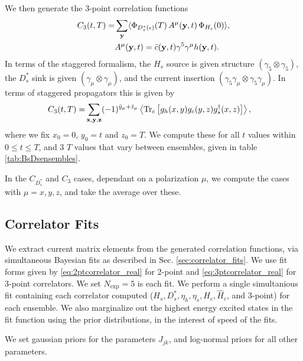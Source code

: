 We then generate the 3-point correlation functions
\begin{align}
  C_3(t,T) =& \sum_{{\bf{y}}} \langle \Phi_{D_s^*(\epsilon)}(T)\, A^{\mu}({\bf{y}},t) \,\Phi_{H_s}(0) \rangle, \\
  &A^{\mu}({\bf{y}},t) = \bar{c}({\bf{y}},t) \gamma^5\gamma^{\mu} h({\bf{y}},t). \nonumber
\end{align}
In terms of the staggered formalism, the $H_s$ source is given structure $(\gamma_5\otimes \gamma_5)$, the $D_s^*$ sink is given $(\gamma_{\mu}\otimes \gamma_{\mu})$, and the current insertion $(\gamma_5\gamma_{\mu}\otimes \gamma_5\gamma_{\mu})$. In terms of staggered propagators this is given by
\begin{align}
  C_3(t,T) =& \sum_{{\bf{x},\bf{y},\bf{z}}} (-1)^{\bar{y}_{\mu}+\bar{z}_{\mu}}\left\langle \text{Tr}_c\left[ g_h(x,y)g_c(y,z) g^{\dagger}_s(x,z) \right] \right\rangle,
\end{align}
where we fix $x_0 = 0$, $y_0=t$ and $z_0=T$. We compute these for all $t$ values within $0\leq t\leq T$, and 3 $T$ values that vary between ensembles, given in table \ref{tab:BsDsensembles}.

In the $C_{D_s^*}$ and $C_3$ cases, dependant on a polarization $\mu$, we compute the cases with $\mu = x,y,z$, and take the average over these.

\subsection{Correlator Fits}
\label{sec:BsDsstar_fits}

We extract current matrix elements from the generated correlation functions, via simultaneous Bayesian fits as described in Sec. \ref{sec:correlator_fits}. We use fit forms given by \eqref{eq:2ptcorrelator_real} for 2-point and \eqref{eq:3ptcorrelator_real} for 3-point correlators. We set $N_{\text{exp}}=5$ is each fit. We perform a single simultanious fit containing each correlator computed ($H_s,D_s^*,\eta_h,\eta_s,H_c,\hat{H}_c$, and 3-point) for each ensemble. We also marginalize out the highest energy excited states in the fit function using the prior distributions, in the interest of speed of the fits.

We set gaussian priors for the parameters $J_{jk}$, and log-normal priors for all other parameters.

